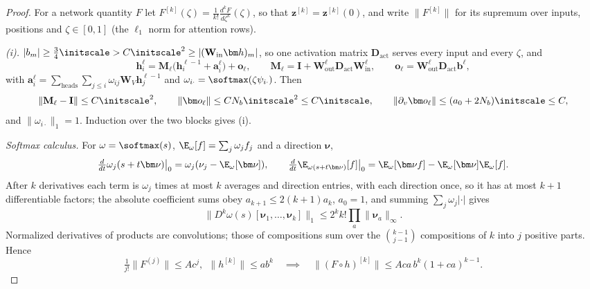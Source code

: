 \begin{proof}
For a network quantity $F$ let $F^{[k]}(\zeta)=\frac{1}{k!}\frac{d^kF}{d\zeta^k}(\zeta)$, so that $\bm z^{[k]}=\bm z^{[k]}(0)$, and write $\|F^{[k]}\|$ for its supremum over
inputs, positions and $\zeta\in[0,1]$ (the $\ell_1$ norm for attention rows).

\emph{(i).} $|b_m|\ge\frac{3}{4}\initscale>C\initscale^2\ge|(\mathbf W_{\mathrm{in}}\bm h)_m|$, so one activation matrix $\mathbf D_{\mathrm{act}}$ serves every input and every $\zeta$, and
\[
 \bm h_i^\ell=\mathbf M_\ell\bigl(\bm h_i^{\ell-1}+\bm a_i^\ell\bigr)+\bm o_\ell,\qquad \mathbf M_\ell=\mathbf I+\mathbf W^\ell_{\mathrm{out}}\mathbf D_{\mathrm{act}}\mathbf W^\ell_{\mathrm{in}},\qquad \bm o_\ell=\mathbf W^\ell_{\mathrm{out}}\mathbf D_{\mathrm{act}}\bm b^\ell,
\]
with $\bm a_i^\ell=\sum_{\mathrm{heads}}\sum_{j\le i}\omega_{ij}\mathbf W_V\bm h^{\ell-1}_j$ and $\omega_{i\cdot}=\softmax(\zeta\psi_{i\cdot})$. Then
\[
 \|\mathbf M_\ell-\mathbf I\|\le C\initscale^2,\qquad \|\bm o_\ell\|\le CN_b\initscale^2\le C\initscale,\qquad \|\partial_v\bm o_\ell\|\le(a_0+2N_b)\initscale\le C,
\]
and $\|\omega_{i\cdot}\|_1=1$. Induction over the two blocks gives (i).

\emph{Softmax calculus.} For $\omega=\softmax(s)$, $\E_\omega[f]=\sum_j\omega_jf_j$ and a direction $\bm\nu$,
\[
 \tfrac{d}{dt}\omega_j(s+t\bm\nu)\big|_0=\omega_j(\nu_j-\E_\omega[\bm\nu]),\qquad
 \tfrac{d}{dt}\E_{\omega(s+t\bm\nu)}[f]\big|_0=\E_\omega[\bm\nu f]-\E_\omega[\bm\nu]\E_\omega[f].
\]
After $k$ derivatives each term is $\omega_j$ times at most $k$ averages and direction entries, with each direction once, so it has at
most $k+1$ differentiable factors; the absolute coefficient sums obey $a_{k+1}\le2(k+1)a_k$, $a_0=1$, and summing $\sum_j\omega_j|\cdot|$ gives
\begin{equation}
 \bigl\|D^k\omega(s)[\bm\nu_1,\ldots,\bm\nu_k]\bigr\|_1\le2^kk!\prod_a\|\bm\nu_a\|_\infty .
 \label{eq:softmax-avg}
\end{equation}
Normalized derivatives of products are convolutions; those of compositions sum over the $\binom{k-1}{j-1}$ compositions of $k$ into $j$
positive parts. Hence
\[
 \tfrac{1}{j!}\|F^{(j)}\|\le Ac^j,\ \ \|h^{[k]}\|\le ab^k\quad\implies\quad\|(F\circ h)^{[k]}\|\le Aca\,b^k(1+ca)^{k-1}.
\]


\end{proof}

